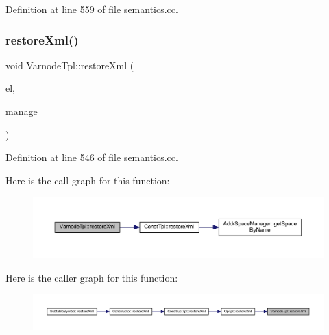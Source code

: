 Definition at line 559 of file semantics.\+cc.

\mbox{\label{class_varnode_tpl_a66657e67cb1b92bd59ff3a5c00b6daf8}} 
\subsubsection{\texorpdfstring{restoreXml()}{restoreXml()}}
{\footnotesize\ttfamily void Varnode\+Tpl\+::restore\+Xml (\begin{DoxyParamCaption}\item[{const \mbox{\hyperlink{class_element}{Element}} $\ast$}]{el,  }\item[{const \mbox{\hyperlink{class_addr_space_manager}{Addr\+Space\+Manager}} $\ast$}]{manage }\end{DoxyParamCaption})}



Definition at line 546 of file semantics.\+cc.

Here is the call graph for this function\+:
\nopagebreak
\begin{figure}[H]
\begin{center}
\leavevmode
\includegraphics[width=350pt]{class_varnode_tpl_a66657e67cb1b92bd59ff3a5c00b6daf8_cgraph}
\end{center}
\end{figure}
Here is the caller graph for this function\+:
\nopagebreak
\begin{figure}[H]
\begin{center}
\leavevmode
\includegraphics[width=350pt]{class_varnode_tpl_a66657e67cb1b92bd59ff3a5c00b6daf8_icgraph}
\end{center}
\end{figure}
\mbox{\label{class_varnode_tpl_a04f5e3155274e1edf51585d8cd09183c}} 

